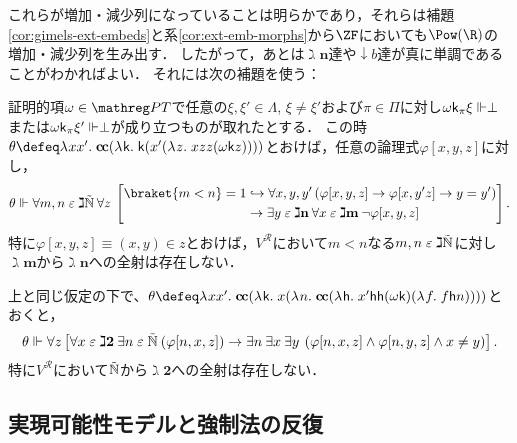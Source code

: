 \documentclass[realisability.tex]{subfiles}
\begin{document}
これらが増加・減少列になっていることは明らかであり，それらは補題\ref{cor:gimels-ext-embeds}と系\ref{cor:ext-emb-morphs}から$\ZF$においても$\Pow(\R)$の増加・減少列を生み出す．
したがって，あとは$\gimel \mathbf{n}$達や$\downarrow b$達が真に単調であることがわかればよい．
それには次の補題を使う：

\begin{lemma}
 証明的項$\omega \in \PT$で任意の$\xi, \xi' \in \Lambda$, $\xi \neq \xi'$および$\pi \in \Pi$に対し$\omega \mathsf{k}_\pi \xi \Vdash \perp$または$\omega\mathsf{k}_\pi \xi' \Vdash \perp$が成り立つものが取れたとする．
 この時$\theta \defeq \abs{x x'}{\cc (\abs{\conti}{\conti (x'(\abs{z}{xzz(\omega \conti z)}))})}$とおけば，任意の論理式$\varphi[x,y,z]$に対し，
 \[
  \theta \Vdash \forall m, n \strin \gimel \NN\: \forall z \:
   \left[\begin{split}
          \braket{m < n} = 1 &\hookrightarrow
          \forall x, y, y' \left( \varphi[x,y,z] \to \varphi[x, y' z] \to y = y'\right)\\
         &\to \exists y \strin \gimel\mathbf{n} \: \forall x \strin \gimel \mathbf{m} \: \neg \varphi[x,y,z]
  \end{split}\right].
 \]
 特に$\varphi[x, y, z] \equiv (x, y) \in z$とおけば，$V^{\mathcal{R}}$において$m < n$なる$m, n \mathrel{\varepsilon} \gimel \mathord{\tilde{\mathbb{N}}}$に対し$\gimel \mathbf{m}$から$\gimel \mathbf{n}$への全射は存在しない．
\end{lemma}

\begin{lemma}
 上と同じ仮定の下で、$\theta \defeq \abs{x x'}{\cc(\abs{\conti}{x(\abs{n}{\cc(\abs{\mathsf{h}}{x'\mathsf{h}\mathsf{h}(\omega \conti)(\abs{f}{f\mathsf{h}n})})})})}$とおくと，
 \[
 \theta \Vdash \forall z \left[ \forall x \mathrel{\varepsilon} \gimel \mathbf{2} \: \exists n \mathrel{\varepsilon} \mathord{\tilde{\mathbb{N}}} \: ( \varphi[n, x, z]) \to \exists n\: \exists x\: \exists y\: \left(\varphi[n, x, z] \land  \varphi[n, y, z] \land x \neq y\right)  \right].
 \]
 特に$V^{\mathcal{R}}$において$\mathord{\tilde{\mathbb{N}}}$から$\gimel \mathbf{2}$への全射は存在しない．
\end{lemma}

\subsection{実現可能性モデルと強制法の反復}
\end{document}
